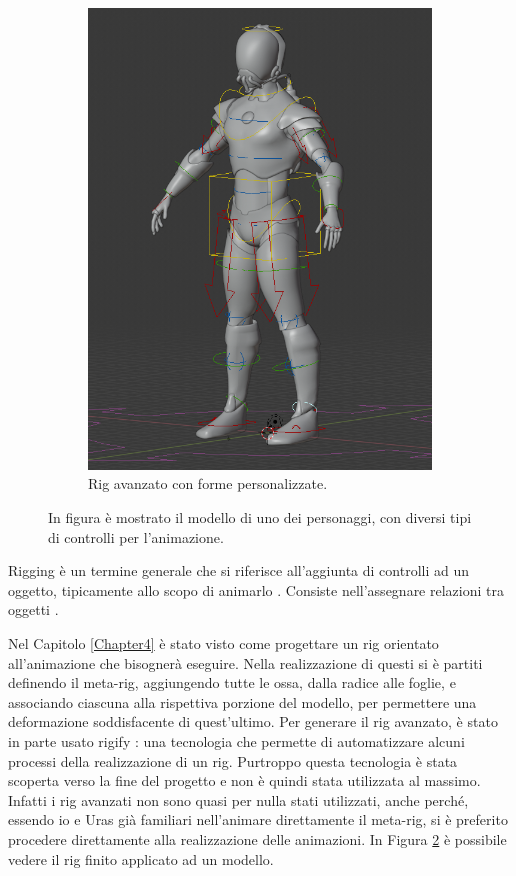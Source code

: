 \begin{figure}
\begin{subfigure}{.33\textwidth}
  \includegraphics[width=\linewidth]{Figures/rig2}
  \caption{Rig avanzato con forme personalizzate.}
  \label{fig:rig2}
\end{subfigure}
\decoRule
\caption[Rig a confronto]{In figura è mostrato il modello di uno dei personaggi, con diversi tipi di controlli per l'animazione.}
\label{fig:rig}
\end{figure}

Rigging è un termine generale che si riferisce all'aggiunta di controlli ad un oggetto, tipicamente allo scopo di animarlo \parencite{blendDoc}.
Consiste nell'assegnare relazioni tra oggetti \parencite{BlendTut}.

Nel Capitolo \ref{Chapter4} è stato visto come progettare un rig orientato all'animazione che bisognerà eseguire.
Nella realizzazione di questi si è partiti definendo il meta-rig, aggiungendo tutte le ossa, dalla radice alle foglie, e associando ciascuna alla rispettiva porzione del modello, per permettere una deformazione soddisfacente di quest'ultimo.
Per generare il rig avanzato, è stato in parte usato rigify \cite{blendDoc}: una tecnologia che permette di automatizzare alcuni processi della realizzazione di un rig.
Purtroppo questa tecnologia è stata scoperta verso la fine del progetto e non è quindi stata utilizzata al massimo. 
Infatti i rig avanzati non sono quasi per nulla stati utilizzati, anche perché, essendo io e Uras già familiari nell'animare direttamente il meta-rig, si è preferito procedere direttamente alla realizzazione delle animazioni.
In Figura \ref{fig:rig} è possibile vedere il rig finito applicato ad un modello.

